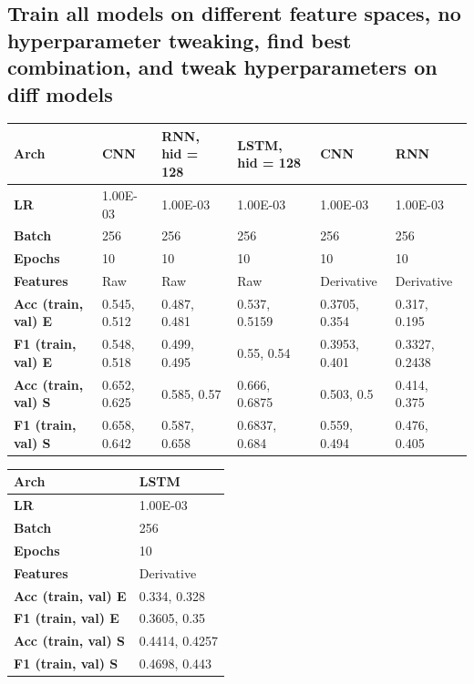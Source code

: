 \documentclass[12pt,a4paper]{article}
\begin{document}
    \subsection{Train all models on different feature spaces, no hyperparameter tweaking, find best combination, and tweak hyperparameters on diff models}
    \begin{table}[!ht]
    \raggedright
    \begin{tabular}{|l|l|l|l|l|l|}
    \hline
        \textbf{Arch} & CNN & RNN, hid = 128 & LSTM, hid = 128 & CNN & RNN \\ \hline
        \textbf{LR} & 1.00E-03 & 1.00E-03 & 1.00E-03 & 1.00E-03 & 1.00E-03 \\ \hline
        \textbf{Batch} & 256 & 256 & 256 & 256 & 256 \\ \hline
        \textbf{Epochs} & 10 & 10 & 10 & 10 & 10 \\ \hline
        \textbf{Features} & Raw & Raw & Raw & Derivative & Derivative \\ \hline
        \textbf{Acc (train, val) E} & 0.545, 0.512 & 0.487, 0.481 & 0.537, 0.5159 & 0.3705, 0.354 & 0.317, 0.195 \\ \hline
        \textbf{F1 (train, val) E} & 0.548, 0.518 & 0.499, 0.495 & 0.55, 0.54 & 0.3953, 0.401 & 0.3327, 0.2438 \\ \hline
        \textbf{Acc (train, val) S} & 0.652, 0.625 & 0.585, 0.57 & 0.666, 0.6875 & 0.503, 0.5 & 0.414, 0.375 \\ \hline
        \textbf{F1 (train, val) S} & 0.658, 0.642 & 0.587, 0.658 & 0.6837, 0.684 & 0.559, 0.494 & 0.476, 0.405 \\ \hline
    \end{tabular}
\end{table}

    \begin{table}[!ht]
    \raggedright
    \begin{tabular}{|l|l|}
    \hline
        \textbf{Arch} & LSTM \\ \hline
        \textbf{LR} & 1.00E-03 \\ \hline
        \textbf{Batch} & 256 \\ \hline
        \textbf{Epochs} & 10 \\ \hline
        \textbf{Features} & Derivative \\ \hline
        \textbf{Acc (train, val) E} & 0.334, 0.328 \\ \hline
        \textbf{F1 (train, val) E} & 0.3605, 0.35 \\ \hline
        \textbf{Acc (train, val) S} & 0.4414, 0.4257 \\ \hline
        \textbf{F1 (train, val) S} & 0.4698, 0.443 \\ \hline
    \end{tabular}
    \end{table}
    \newpage
\end{document}
